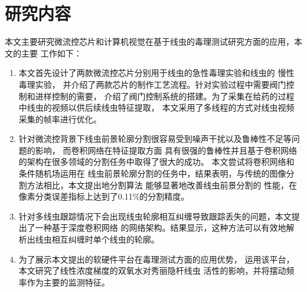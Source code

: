\section{研究内容}
\label{sec:intro:org}
	本文主要研究微流控芯片和计算机视觉在基于线虫的毒理测试研究方面的应用，本文的主要
	工作如下：
	\begin{enumerate}
	  \item 本文首先设计了两款微流控芯片分别用于线虫的急性毒理实验和线虫的
	  慢性毒理实验，
	  并介绍了两款芯片的制作工艺流程。针对实验过程中需要阀门控制和进样控制的需要，
	  介绍了阀门控制系统的搭建。为了采集在给药的过程中线虫的视频以供后续线虫特征提取，
	  本文采用了多线程的方式对线虫视频采集的帧率进行优化。
	  \item 针对微流控背景下线虫前景轮廓分割很容易受到噪声干扰以及鲁棒性不足等问题的影响，
	  而卷积网络在特征提取方面
	  具有很强的鲁棒性并且基于卷积网络的架构在很多领域的分割任务中取得了很大的成功。
	  本文尝试将卷积网络和条件随机场运用在
	  线虫前景轮廓分割的任务中，结果表明，与传统的图像分割方法相比，本文提出地分割算法
	  能够显著地改善线虫前景分割的
	  性能，在像素分类误差指标上达到了0.11\%的分割精度。
	  \item 针对多线虫跟踪情况下会出现线虫轮廓相互纠缠导致跟踪丢失的问题，本文提出了一种基于深度卷积网络
	  的网络架构。结果显示，这种方法可以有效地解析出线虫相互纠缠时单个线虫的轮廓。
	  \item 为了展示本文提出的软硬件平台在毒理测试方面的应用优势，
	  运用该平台，本文研究了线性浓度梯度的双氧水对秀丽隐杆线虫
	  活性的影响，并将摆动频率作为主要的监测特征。
	\end{enumerate}
	

